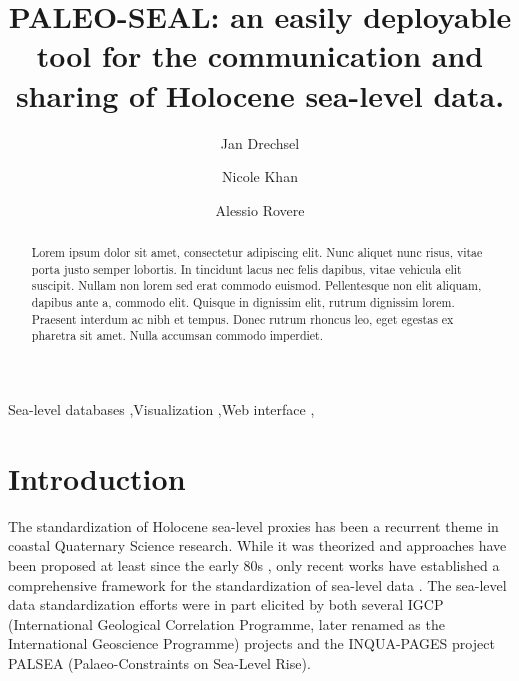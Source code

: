 \documentclass[a4paper,fleqn]{cas-dc}
\begin{document}
\let\WriteBookmarks\relax
\def\floatpagepagefraction{1}
\def\textpagefraction{.001}

\title [mode = title]{PALEO-SEAL: an easily deployable tool for the communication and sharing of Holocene sea-level data.}                      

\author[1]{Jan Drechsel}
\address[1]{MARUM, Center for Marine Environmental Sciences, University of Bremen, Germany}

\author[2]{Nicole Khan}
\address[2]{Department of Earth Sciences, University of Hong Kong, Hong Kong}

\author[1]{Alessio Rovere}
\cormark[1]

\begin{abstract}
Lorem ipsum dolor sit amet, consectetur adipiscing elit. Nunc aliquet nunc risus, vitae porta justo semper lobortis. In tincidunt lacus nec felis dapibus, vitae vehicula elit suscipit. Nullam non lorem sed erat commodo euismod. Pellentesque non elit aliquam, dapibus ante a, commodo elit. Quisque in dignissim elit, rutrum dignissim lorem. Praesent interdum ac nibh et tempus. Donec rutrum rhoncus leo, eget egestas ex pharetra sit amet. Nulla accumsan commodo imperdiet.
\end{abstract}

\begin{keywords}
Sea-level databases \sep Visualization \sep Web interface \sep 
\end{keywords}

\maketitle

\section{Introduction}
The standardization of Holocene sea-level proxies has been a recurrent theme in coastal Quaternary Science research. While it was theorized and approaches have been proposed at least since the early 80s \citep{shennan1982,shennan1983,VanDePlassche1986}, only recent works have established a comprehensive framework for the standardization of sea-level data \citep{khan2019}. The sea-level data standardization efforts were in part elicited by both several IGCP (International Geological Correlation Programme, later renamed as the International Geoscience Programme) projects and the INQUA-PAGES project PALSEA (Palaeo-Constraints on Sea-Level Rise). 
\end{document}
